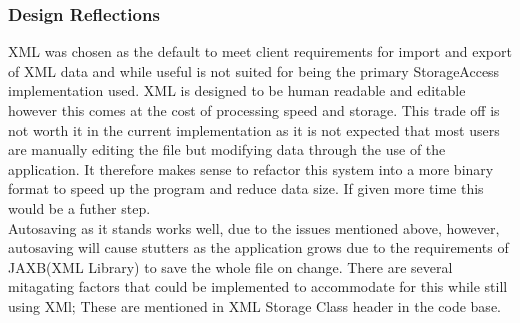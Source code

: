 \subsubsection{Design Reflections}
XML was chosen as the default to meet client requirements for import and export of XML data and while useful is not suited for being the primary StorageAccess implementation used.
XML is designed to be human readable and editable however this comes at the cost of processing speed and storage. This trade off is not worth it in the current implementation
as it is not expected that most users are manually editing the file but modifying data through the use of the application. It therefore makes sense to refactor this system into a more binary format
to speed up the program and reduce data size. If given more time this would be a futher step.\\

Autosaving as it stands works well, due to the issues mentioned above, however, autosaving will cause stutters as the application grows due to the requirements of JAXB(XML Library) to save the whole file on change.
There are several mitagating factors that could be implemented to accommodate for this while still using XMl; These are mentioned in XML Storage Class header in the code base. \\